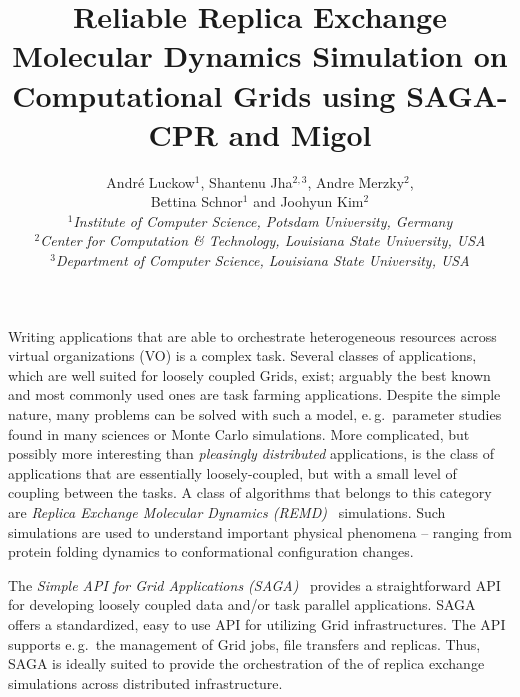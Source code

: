 \documentclass[a4paper,10pt]{article}
\title{Reliable Replica Exchange Molecular Dynamics Simulation on
  Computational Grids using SAGA-CPR and Migol}
\author{
  Andr\'e Luckow$^{1}$, 
  Shantenu Jha$^{2,3}$, 
  Andre Merzky$^{2}$, \\
  Bettina Schnor$^{1}$ and 
  Joohyun Kim$^{2}$\\
  \small{\emph{$^{1}$Institute of Computer Science, Potsdam University, Germany}}\\
  \small{\emph{$^{2}$Center for Computation \& Technology, Louisiana State University, USA}}\\
  \small{\emph{$^{3}$Department of Computer Science, Louisiana State University, USA}}\\
}
\begin{document}
 


\maketitle


                           

Writing applications that are able to orchestrate heterogeneous
resources across virtual organizations (VO) is a complex task.  Several 
classes of applications, which are well suited for loosely
coupled Grids, exist; arguably the best known and most commonly used ones are
task farming applications. Despite the simple nature, many problems
can be solved with such a model, e.\,g.\ parameter studies found in
many sciences or Monte Carlo simulations. More
complicated, but possibly more interesting than {\it pleasingly
  distributed} applications, is the class of applications that are
essentially loosely-coupled, but with a small level of coupling
between the tasks.   A class of algorithms that belongs to this category are
\emph{Replica Exchange Molecular Dynamics (REMD)}~\cite{hansmann,Sugita:1999rm} simulations.
Such simulations are used to understand important physical
phenomena -- ranging from protein folding dynamics to conformational
configuration changes.

The \emph{Simple API for Grid Applications (SAGA)}~\cite{saga_gfd90}
provides a straightforward API for developing loosely coupled data and/or task
parallel applications.
SAGA offers a standardized, easy to use API for utilizing Grid
infrastructures. The API supports e.\,g.\ the management of Grid jobs,
file transfers and replicas. Thus, SAGA is ideally suited to provide
the orchestration of the of replica exchange simulations across
distributed infrastructure.
                                                         
\end{document}

